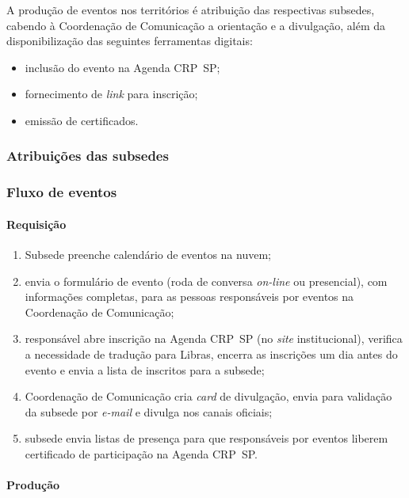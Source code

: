 A produção de eventos nos territórios é atribuição das respectivas subsedes, cabendo à Coordenação de Comunicação a orientação e a divulgação, além da disponibilização das seguintes ferramentas digitais:

\begin{itemize}
	\item
	inclusão do evento na Agenda CRP~SP;
	\item
	fornecimento de \emph{link} para inscrição;
	\item
	emissão de certificados.
\end{itemize}

\subsubsection{Atribuições das subsedes}

\subsubsection{Fluxo de eventos}

\paragraph{Requisição}

\begin{enumerate}
	\def\labelenumi{\arabic{enumi}.}
	\item
	Subsede preenche calendário de eventos na nuvem;
	\item
	envia o formulário de evento (roda de conversa \emph{on-line} ou   presencial), com informações completas, para as pessoas responsáveis por eventos na Coordenação de Comunicação;
	\item
	responsável abre inscrição na Agenda CRP~SP (no \emph{site}  institucional), verifica a necessidade de tradução para Libras, encerra as inscrições um dia antes do evento e envia a lista de inscritos para a subsede;
	\item
	Coordenação de Comunicação cria \emph{card} de divulgação, envia para validação da subsede por \emph{e-mail} e divulga nos canais oficiais;
	\item
	subsede envia listas de presença para que responsáveis por eventos liberem certificado de participação na Agenda CRP~SP.
\end{enumerate}

\paragraph{Produção}

